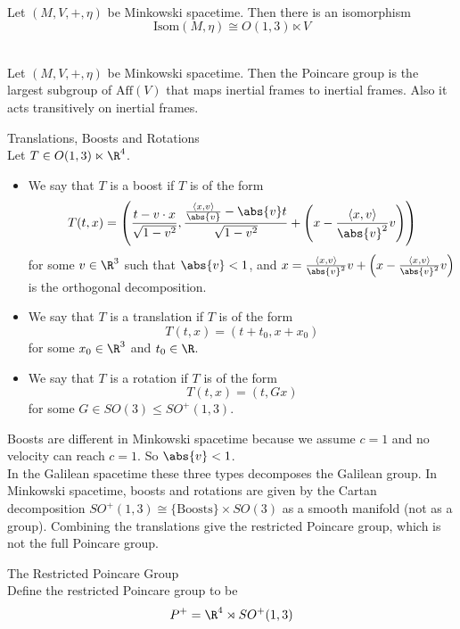 \documentclass[a4paper]{article}
\begin{document}
\begin{prp}{}{}\\
Let $(M,V,+,\eta)$ be Minkowski spacetime. Then there is an isomorphism $$\text{Isom}(M,\eta)\cong O(1,3)\ltimes V$$
\end{prp}

\begin{prp}{}{}\\
Let $(M,V,+,\eta)$ be Minkowski spacetime. Then the Poincare group is the largest subgroup of $\text{Aff}(V)$ that maps inertial frames to inertial frames. Also it acts transitively on inertial frames. 
\end{prp}

\begin{defn}{Translations, Boosts and Rotations}{}\\
Let $T\in O(1,3)\ltimes\R^4$. 
\begin{itemize}
\item We say that $T$ is a boost if $T$ is of the form $$T(t,x)=\left(\frac{t-v\cdot x}{\sqrt{1-v^2}},\frac{\frac{\langle x,v\rangle}{\abs{v}}-\abs{v}t}{\sqrt{1-v^2}}+\left(x-\frac{\langle x,v\rangle}{\abs{v}^2}v\right)\right)$$ for some $v\in\R^3$ such that $\abs{v}<1$, and $x=\frac{\langle x,v\rangle}{\abs{v}^2}v+\left(x-\frac{\langle x,v\rangle}{\abs{v}^2}v\right)$ is the orthogonal decomposition. 
\item We say that $T$ is a translation if $T$ is of the form $$T(t,x)=(t+t_0,x+x_0)$$ for some $x_0\in\R^3$ and $t_0\in\R$. 
\item We say that $T$ is a rotation if $T$ is of the form $$T(t,x)=(t,Gx)$$ for some $G\in SO(3)\leq SO^+(1,3)$. 
\end{itemize}
\end{defn}

Boosts are different in Minkowski spacetime because we assume $c=1$ and no velocity can reach $c=1$. So $\abs{v}<1$. \\

In the Galilean spacetime these three types decomposes the Galilean group. In Minkowski spacetime, boosts and rotations are given by the Cartan decomposition $SO^+(1,3)\cong\{\text{Boosts}\}\times SO(3)$ as a smooth manifold (not as a group). Combining the translations give the restricted Poincare group, which is not the full Poincare group. 

\begin{defn}{The Restricted Poincare Group}{}\\
Define the restricted Poincare group to be $$P^+=\R^4\rtimes SO^+(1,3)$$
\end{defn}
\end{document}
